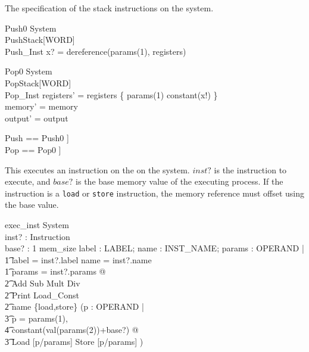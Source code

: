 \documentclass{article}
\begin{document}
The specification of the stack instructions on the system.

\begin{schema}{Push0}
  \Xi System\\
  PushStack[WORD]\\
  Push\_Inst
\where
  x? = dereference(params(1), registers)
\end{schema}

\begin{schema}{Pop0}
  \Delta System\\
  PopStack[WORD]\\
  Pop\_Inst
\where
  registers' = registers \oplus \{ params(1) \mapsto constant(x!) \}\\
  memory' = memory\\
  output' = output
\end{schema}

\begin{zed}
  Push == Push0 \project [ System ; Stack [WORD] ]\\
  Pop == Pop0 \project [System ; Stack [WORD] ]
\end{zed}

This executes an instruction on the on the system. $inst?$ is the
instruction to execute, and $base?$ is the base memory value of the
executing process. If the instruction is a {\tt load} or {\tt store}
instruction, the memory reference must offset using the base value.

\begin{schema}{exec\_inst}
  \Delta System\\
  inst? : Instruction\\
  base? : 1 \upto mem\_size
\where
  \exists label : \power LABEL; name : INST\_NAME; params : \seq OPERAND |\\
    \t1 label = inst?.label \land name = inst?.name \land \\
    \t1 params = inst?.params @\\
      \t2 Add \lor Sub \lor Mult \lor Div \lor\\
      \t2 Print \lor Load\_Const \lor\\
      \t2 name \in \{load,store\} \implies (\exists p : \seq OPERAND |\\
        \t3 p = \langle params(1), \\
          \t4 constant(val(params(2))+base?) \rangle @\\
        \t3 Load [p/params] \lor Store [p/params] )
\end{schema}
\end{document}
